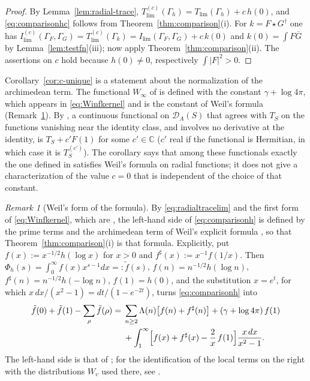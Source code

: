 \documentclass[11pt]{amsart}
\theoremstyle{remark}
\newtheorem{remark}[theorem]{Remark}
\numberwithin{equation}{section}
\newcommand{\C}{\mathbb C}
\newcommand{\DA}{\mathcal D_A}
\newcommand{\Tl}{T_{\lim}}
\newcommand{\Il}{I_{\lim}}
\begin{document}
\begin{proof}
By Lemma~\ref{lem:radial-trace},
$T^{(c)}_{\lim}(\Gamma_h)=\Tl(\Gamma_h)+c\,h(0)$, and
\eqref{eq:comparisonhc} follows from Theorem~\ref{thm:comparison}(i).  For
$k=F\star G^\dagger$ one has
$I^{(c)}_{\lim}(\Gamma_F,\Gamma_G)=T^{(c)}_{\lim}(\Gamma_k)
=\Il(\Gamma_F,\Gamma_G)+c\,k(0)$ and $k(0)=\int F\overline G$ by
Lemma~\ref{lem:testfn}(iii); now apply Theorem~\ref{thm:comparison}(ii).
The assertions on $c$ hold because $h(0)\ne0$, respectively
$\int|F|^2>0$.
\end{proof}

Corollary~\ref{cor:c-unique} is a statement about the normalization of the
archimedean term.  The functional $W_\infty$ of
\cite[Definition~5.4]{P43} is defined with the constant $\gamma+\log4\pi$,
which appears in \eqref{eq:Winfkernel} and is the constant of Weil's
formula (Remark~\ref{rem:weilform}).  By \cite[Theorem~5.7]{P43}, a
continuous functional on $\DA(S)$ that agrees with $T_S$ on the functions
vanishing near the identity class, and involves no derivative at the
identity, is $T_S+c'F(1)$ for some $c'\in\C$ ($c'$ real if the functional
is Hermitian, in which case it is $T^{(c')}_S$).  The corollary says that
among these functionals exactly the one defined in \cite{P43} satisfies
Weil's formula on radial functions; it does not give a characterization of
the value $c=0$ that is independent of the choice of that constant.

\begin{remark}[Weil's form of the formula]
\label{rem:weilform}
By \eqref{eq:radialtracelim} and the first form of \eqref{eq:Winfkernel},
which are \cite[Lemma~A.1]{P43}, the left-hand side of
\eqref{eq:comparisonh} is defined by the prime terms and the archimedean
term of Weil's explicit formula \cite{Weil1952}, so that
Theorem~\ref{thm:comparison}(i) is that formula.  Explicitly, put
$f(x):=x^{-1/2}h(\log x)$ for $x>0$ and $f^\sharp(x):=x^{-1}f(1/x)$.  Then
$\Phi_h(s)=\int_0^\infty f(x)x^{s-1}dx=:\tilde f(s)$,
$f(n)=n^{-1/2}h(\log n)$, $f^\sharp(n)=n^{-1/2}h(-\log n)$, $f(1)=h(0)$, and
the substitution $x=e^t$, for which $x\,dx/(x^2-1)=dt/(1-e^{-2t})$, turns
\eqref{eq:comparisonh} into
\[
\begin{aligned}
  \tilde f(0)+\tilde f(1)-\sum_\rho\tilde f(\rho)
  ={}&\sum_{n\ge2}\Lambda(n)\bigl[f(n)+f^\sharp(n)\bigr]
   +(\gamma+\log4\pi)\,f(1)\\
  &+\int_1^\infty\Bigl[f(x)+f^\sharp(x)-\frac2x\,f(1)\Bigr]
    \frac{x\,dx}{x^2-1}.
\end{aligned}
\]
The left-hand side is that of \cite[(1)]{CCWeilArch}; for the
identification of the local terms on the right with the distributions
$W_v$ used there, see \cite[Sections~5 and~8]{P43}.
\end{remark}
\end{document}
